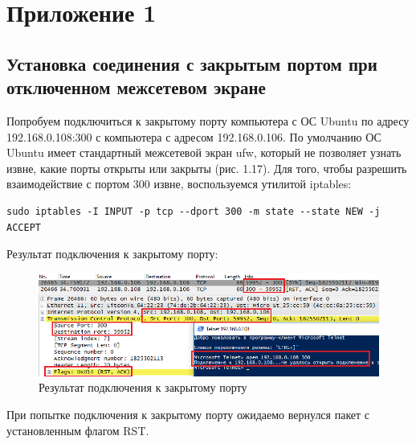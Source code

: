 \documentclass[14pt,a4paper,report]{report}
\begin{document}
\section{Приложение 1}

\subsection{Установка соединения с закрытым портом при отключенном межсетевом экране}

Попробуем подключиться к закрытому порту компьютера с ОС Ubuntu по адресу 192.168.0.108:300 с компьютера с адресом 192.168.0.106. По умолчанию ОС Ubuntu имеет стандартный межсетевой экран ufw, который не позволяет узнать извне, какие порты открыты или закрыты (рис. 1.17). Для того, чтобы разрешить взаимодействие с портом 300 извне, воспользуемся утилитой iptables:

\begin{verbatim}
sudo iptables -I INPUT -p tcp --dport 300 -m state --state NEW -j ACCEPT
\end{verbatim}

Результат подключения к закрытому порту:

\begin{figure}[h!]
	\centering
	\includegraphics[scale = 0.80]{images/tcp7.png}
	
	\caption{Результат подключения к закрытому порту}
	\label{image:21}
\end{figure}

При попытке подключения к закрытому порту ожидаемо вернулся пакет с установленным флагом RST.
\end{document}
